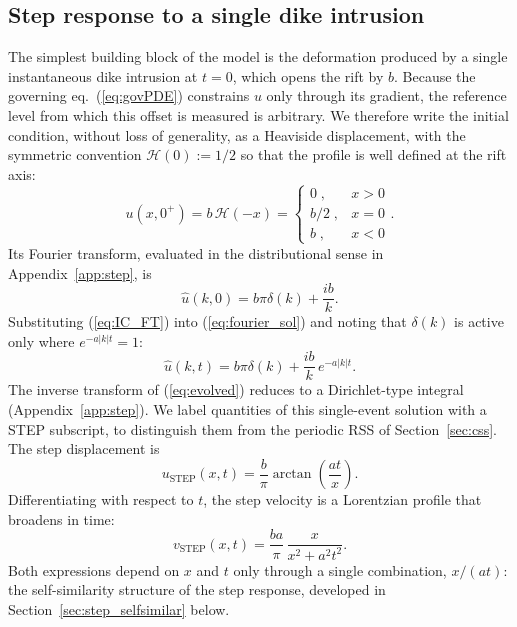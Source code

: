 \documentclass[extra]{gji}
\begin{document}
\subsection{Step response to a single dike intrusion}
\label{sec:step}

The simplest building block of the model is the deformation produced by a
single instantaneous dike intrusion at $t = 0$, which opens the rift by $b$.
Because the governing eq.~(\ref{eq:govPDE}) constrains $u$ only through
its gradient, the reference level from which this offset is measured is
arbitrary. We therefore write the initial condition, without loss of
generality, as a Heaviside displacement, with the symmetric convention
$\mathcal{H}(0) := 1/2$ so that the profile is well defined at the rift
axis:
\begin{equation}
u(x,0^+) = b\,\mathcal{H}(-x) = \begin{cases}
  0 \; , & x>0 \\
  b/2 \; , & x=0 \\
  b \; , & x<0
\end{cases}.
\label{eq:IC}
\end{equation}
Its Fourier transform, evaluated in the distributional sense in
Appendix~\ref{app:step}, is
\begin{equation}
\hat{u}(k,0) = b\pi\delta(k) + \frac{ib}{k}.
\label{eq:IC_FT}
\end{equation}
Substituting (\ref{eq:IC_FT}) into (\ref{eq:fourier_sol}) and noting that
$\delta(k)$ is active only where $e^{-a|k|t}=1$:
\begin{equation}
\hat{u}(k,t) = b\pi\delta(k) + \frac{ib}{k}\,e^{-a|k|t}.
\label{eq:evolved}
\end{equation}
The inverse transform of (\ref{eq:evolved}) reduces to a Dirichlet-type
integral (Appendix~\ref{app:step}). We label quantities of this
single-event solution with a STEP subscript, to distinguish them from the
periodic RSS of Section~\ref{sec:css}. The step
displacement is
\begin{equation}
u_{\text{STEP}}(x,t) = \frac{b}{\pi}\arctan\!\left(\frac{at}{x}\right).
\label{eq:step}
\end{equation}
Differentiating with respect to $t$, the step velocity is a Lorentzian
profile that broadens in time:
\begin{equation}
v_{\text{STEP}}(x,t) = \frac{b a}{\pi}\,\frac{x}{x^2 + a^2t^2}.
\label{eq:stepv}
\end{equation}
Both expressions depend on $x$ and $t$ only through a single combination,
$x/(at)$: the self-similarity structure of the step response, developed
in Section~\ref{sec:step_selfsimilar} below.
\end{document}
